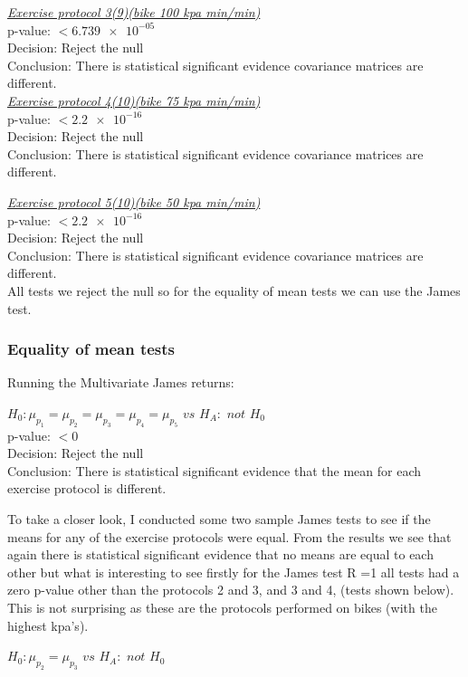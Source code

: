 \documentclass[a4paper]{article}
\begin{document}

\underline{\textit{Exercise protocol 3(9)(bike 100 kpa min/min)}}\\
p-value: $< \num{6.739e-05}$\\
Decision: Reject the null\\
Conclusion: There is statistical significant evidence covariance matrices
are different.\\


\underline{\textit{Exercise protocol 4(10)(bike 75 kpa min/min)}}\\
p-value: $< \num{2.2e-16}$\\
Decision: Reject the null\\
Conclusion: There is statistical significant evidence covariance matrices
are different.\\

\newpage

\underline{\textit{Exercise protocol 5(10)(bike 50
kpa min/min)}}\\
p-value: $< \num{2.2e-16}$\\
Decision: Reject the null\\
Conclusion: There is statistical significant evidence covariance matrices
are different.\\

All tests we reject the null so for the equality of mean tests we can use the
James test.

\subsubsection{Equality of mean tests}

Running the Multivariate James returns:

$H_0 : \mu_{p_1} = \mu_{p_2} = \mu_{p_3} = \mu_{p_4}  = \mu_{p_5}$ $vs$ $H_A :$
$not$ $H_0$\\
p-value: $< \num{0}$\\
Decision: Reject the null\\
Conclusion: There is statistical significant evidence that the mean for each
exercise protocol is different.\\
\newpage

To take a closer look, I conducted some two sample James tests to see if the
means for any of the exercise protocols were equal.
From the results we see that again there is statistical significant evidence
that no means are equal to each other but what is interesting to see firstly for
the James test R =1 all tests had a zero p-value other than the protocols 2 and
3, and 3 and 4, (tests shown below). This is not surprising as these are the
protocols performed on bikes (with the highest kpa's).

$H_0 : \mu_{p_2} = \mu_{p_3}$ $vs$ $H_A :$ $not$ $H_0$\\
\end{document}
